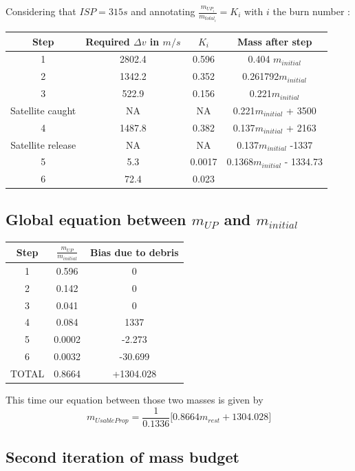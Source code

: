 Considering that \(ISP = 315s\) and annotating
\(\frac{m_{UP_i}}{m_{total_i}} = K_i\) with \(i\) the burn number :

\begin{longtable}[]{@{}cccc@{}}
	\toprule
	Step & Required \(\Delta v\) in \(m/s\) & \(K_i\) & Mass after
	step\tabularnewline
	\midrule
	\endhead
	1 & 2802.4 & 0.596 & 0.404 \(m_{initial}\)\tabularnewline
	2 & 1342.2 & 0.352 & 0.261792\(m_{initial}\)\tabularnewline
	3 & 522.9 & 0.156 & 0.221\(m_{initial}\)\tabularnewline
	Satellite caught & NA & NA & 0.221\(m_{initial}\) + 3500\tabularnewline
	4 & 1487.8 & 0.382 & 0.137\(m_{initial}\) + 2163\tabularnewline
	Satellite release & NA & NA & 0.137\(m_{initial}\) -1337\tabularnewline
	5 & 5.3 & 0.0017 & 0.1368\(m_{initial}\) - 1334.73\tabularnewline
	6 & 72.4 & 0.023 &\tabularnewline
	\bottomrule
\end{longtable}

\hypertarget{header-n470}{%
	\subsection{\texorpdfstring{Global equation between \(m_{UP}\) and
			\(m_{initial}\)}{Global equation between m\_\{UP\} and m\_\{initial\}}}\label{header-n470}}
\begin{longtable}[]{@{}ccc@{}}
	\toprule
	Step & \(\frac{m_{UP}}{m_{initial}}\) & Bias due to
	debris\tabularnewline
	\midrule
	\endhead
	1 & 0.596 & 0\tabularnewline
	2 & 0.142 & 0\tabularnewline
	3 & 0.041 & 0\tabularnewline
	4 & 0.084 & 1337\tabularnewline
	5 & 0.0002 & -2.273\tabularnewline
	6 & 0.0032 & -30.699\tabularnewline
	TOTAL & 0.8664 & +1304.028\tabularnewline
	\bottomrule
\end{longtable}



This time our equation between those two masses is given by 
\begin{equation}
	m_{UsableProp} = \frac 1{0.1336}\bigg[0.8664 m_{rest} + 1304.028\bigg]
\end{equation}

\subsection{Second iteration of mass budget}

